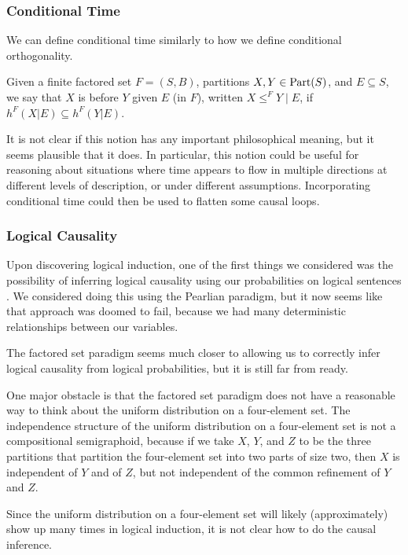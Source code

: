 \documentclass[authordate,onecolumn]{miri-tech-article}
\begin{document}
\subsubsection{Conditional Time}
We can define conditional time similarly to how we define conditional orthogonality.

\begin{definition}
Given a finite factored set $F=(S,B)$, partitions $X,Y\in \text{Part}(S)$, and $E\subseteq S$, we say that $X$ is before $Y$ given $E$ (in $F$), written $X\leq^F Y \mid E$, if $h^F(X|E)\subseteq h^F(Y|E)$.
\end{definition}

It is not clear if this notion has any important philosophical meaning, but it seems plausible that it does. In particular, this notion could be useful for reasoning about situations where time appears to flow in multiple directions at different levels of description, or under different assumptions. Incorporating conditional time could then be used to flatten some causal loops.

\subsubsection{Logical Causality}
Upon discovering logical induction, one of the first things we considered was the possibility of inferring logical causality using our probabilities on logical sentences \citep{Garrabrant:2016:li}. We considered doing this using the Pearlian paradigm, but it now seems like that approach was doomed to fail, because we had many deterministic relationships between our variables.

The factored set paradigm seems much closer to allowing us to correctly infer logical causality from logical probabilities, but it is still far from ready. 

One major obstacle is that the factored set paradigm does not have a reasonable way to think about the uniform distribution on a four-element set. The independence structure of the uniform distribution on a four-element set is not a compositional semigraphoid, because if we take $X$, $Y$, and $Z$ to be the three partitions that partition the four-element set into two parts of size two, then $X$ is independent of $Y$ and of $Z$, but not independent of the common refinement of $Y$ and $Z$.

Since the uniform distribution on a four-element set will likely (approximately) show up many times in logical induction, it is not clear how to do the causal inference.
\end{document}
